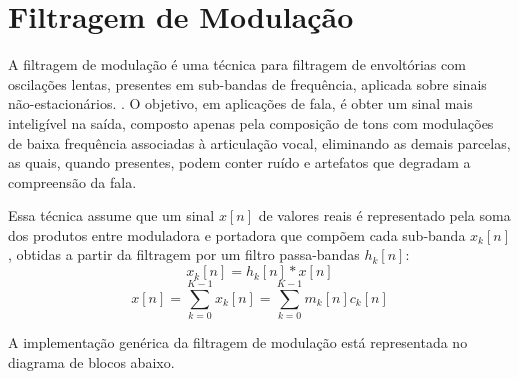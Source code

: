 \section{Filtragem de Modulação} \label{section_fil_mod} A filtragem de
modulação é uma técnica para filtragem de envoltórias com oscilações lentas,
presentes em sub-bandas de frequência, aplicada sobre sinais
não-estacionários.\cite{clark2009sum} \cite{li2005properties}. O objetivo, em
aplicações de fala, é obter um sinal mais inteligível na saída, composto apenas
pela composição de tons com modulações de baixa frequência associadas à
articulação vocal, eliminando as demais parcelas, as quais, quando presentes,
podem conter ruído e artefatos que degradam a compreensão da fala.


Essa técnica assume que um sinal $x[n]$ de valores reais é representado pela
soma dos produtos entre moduladora e portadora que compõem cada sub-banda
$x_k[n]$, obtidas a partir da filtragem por um filtro passa-bandas $h_k[n]$:
\begin{equation}
    x_k[n] = h_k[n] \ast x[n]
\end{equation}
\begin{equation}
    x[n] = \sum_{k = 0}^{K - 1} x_k[n] = \sum_{k = 0}^{K - 1} m_k[n] c_k[n]
\end{equation}

A implementação genérica da filtragem de modulação está representada no diagrama
de blocos abaixo.

